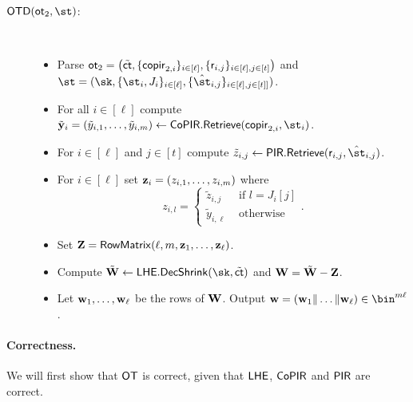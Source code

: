 \begin{description}
\item[$\OTD(\ot_2,\st)$:]~
\begin{itemize}
    \item Parse $\mathsf{ot}_2=\left(\tilde{\mathsf{ct}},\{\mathsf{copir}_{2,i}\}_{i\in[\ell]}, \{\mathsf{r}_{i,j}\}_{i \in [\ell], j \in [t]} \right)$ and  $\st = (\sk,\{\st_i,J_i\}_{i \in [\ell]},\{\hat{\st}_{i,j}\}_{i \in [\ell], j \in [t]]})$.
    \item For all $i\in[\ell]$ compute $\tilde \yn_i=(\tilde y_{i,1},\dots, \tilde y_{i,m})\leftarrow\CoPIR.\retrieve(\copir_{2,i},\st_i)$.
    \item For $i \in [\ell]$ and $j \in [t]$ compute $\tilde{z}_{i,j} \gets \PIR.\retrieve(\resp_{i,j},\hat{\st}_{i,j})$.
    \item For $i\in [\ell]$ set $\mathbf{z}_i=(z_{i,1},\dots, z_{i,m})$ where  
    \[
    z_{i,l} = \begin{cases}\tilde{z}_{i,j} & \text{ if } l = J_i[j] \\ \tilde y_{i,\ell} & \text{ otherwise} \end{cases}.
    \]
    \item Set $\mathbf{Z} = \mathsf{RowMatrix}(\ell,m,\mathbf{z}_1,\dots,\mathbf{z}_\ell)$.
    \item Compute $\tilde{\vc{W}} \gets \LHE.\decshrink(\sk,\tilde{\ct})$ and $\mathbf{W} = \tilde{\mathbf{W}} - \mathbf{Z}$.
    \item Let $\mathbf{w}_1,\dots,\mathbf{w}_\ell$ be the rows of $\mathbf{W}$. Output $\wn = (\wn_1 \| \dots \| \wn_\ell) \in \bin^{m \ell}$.
\end{itemize}
\end{description}

\paragraph{Correctness.} We will first show that $\mathsf{OT}$ is correct, given that $\mathsf{LHE}$, $\mathsf{CoPIR}$ and $\mathsf{PIR}$ are correct. 


